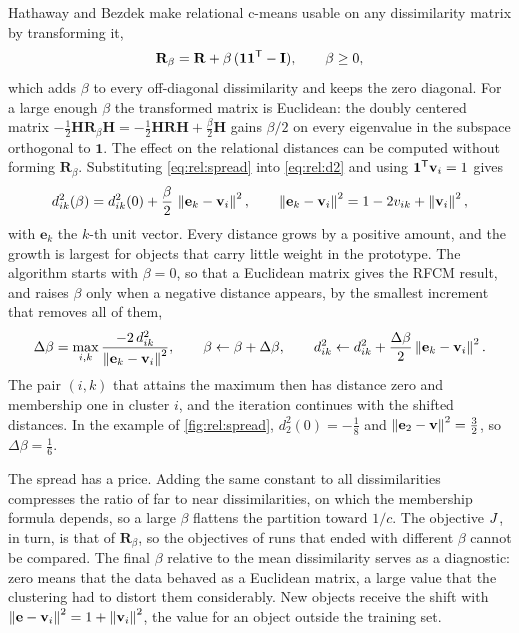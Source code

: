 Hathaway and Bezdek \cite{hathaway:1994:nerf} make relational c-means usable on any dissimilarity matrix by transforming it,
\begin{equation}
  \mathbf{R}_\beta=\mathbf{R}+\beta\,(\mathbf{1}\mathbf{1}^{\mathsf{T}}-\mathbf{I}),\qquad \beta\ge0,
  \label{eq:rel:spread}
\end{equation}
which adds $\beta$ to every off-diagonal dissimilarity and keeps the zero diagonal. For a large enough $\beta$ the transformed matrix is Euclidean: the doubly centered matrix $-\frac12\mathbf{H}\mathbf{R}_\beta\mathbf{H}=-\frac12\mathbf{H}\mathbf{R}\mathbf{H}+\frac{\beta}{2}\mathbf{H}$ gains $\beta/2$ on every eigenvalue in the subspace orthogonal to $\mathbf{1}$. The effect on the relational distances can be computed without forming $\mathbf{R}_\beta$. Substituting \eqref{eq:rel:spread} into \eqref{eq:rel:d2} and using $\mathbf{1}^{\mathsf{T}}\mathbf{v}_i=1$ gives
\begin{equation}
  d^2_{ik}(\beta)=d^2_{ik}(0)+\frac{\beta}{2}\,\left\lVert \mathbf{e}_k-\mathbf{v}_i \right\rVert^2,\qquad
  \left\lVert \mathbf{e}_k-\mathbf{v}_i \right\rVert^2=1-2v_{ik}+\left\lVert \mathbf{v}_i \right\rVert^2,
  \label{eq:rel:shift}
\end{equation}
with $\mathbf{e}_k$ the $k$-th unit vector. Every distance grows by a positive amount, and the growth is largest for objects that carry little weight in the prototype. The algorithm starts with $\beta=0$, so that a Euclidean matrix gives the RFCM result, and raises $\beta$ only when a negative distance appears, by the smallest increment that removes all of them,
\begin{equation}
  \Delta\beta=\max_{i,k}\frac{-2\,d^2_{ik}}{\left\lVert \mathbf{e}_k-\mathbf{v}_i \right\rVert^2},\qquad
  \beta\leftarrow\beta+\Delta\beta,\qquad
  d^2_{ik}\leftarrow d^2_{ik}+\frac{\Delta\beta}{2}\left\lVert \mathbf{e}_k-\mathbf{v}_i \right\rVert^2 .
  \label{eq:rel:dbeta}
\end{equation}
The pair $(i,k)$ that attains the maximum then has distance zero and membership one in cluster $i$, and the iteration continues with the shifted distances. In the example of \cref{fig:rel:spread}, $d^2_{2}(0)=-\frac18$ and $\left\lVert \mathbf{e}_2-\mathbf{v} \right\rVert^2=\frac32$, so $\Delta\beta=\frac16$.

The spread has a price. Adding the same constant to all dissimilarities compresses the ratio of far to near dissimilarities, on which the membership formula depends, so a large $\beta$ flattens the partition toward $1/c$. The objective $J$, in turn, is that of $\mathbf{R}_\beta$, so the objectives of runs that ended with different $\beta$ cannot be compared. The final $\beta$ relative to the mean dissimilarity serves as a diagnostic: zero means that the data behaved as a Euclidean matrix, a large value that the clustering had to distort them considerably. New objects receive the shift with $\left\lVert \mathbf{e}-\mathbf{v}_i \right\rVert^2=1+\left\lVert \mathbf{v}_i \right\rVert^2$, the value for an object outside the training set.

